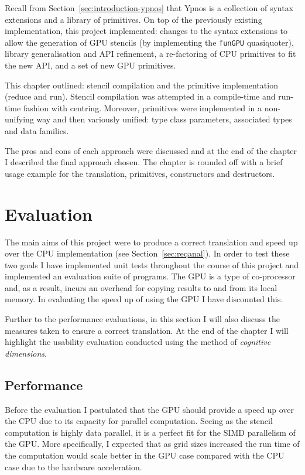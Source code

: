 \documentclass[
    12pt,
    a4paper,
    twoside,
    openright,
    ]{scrbook}
\begin{document}
Recall from Section~\ref{sec:introduction-ypnos} that Ypnos is a collection of
syntax extensions and a library of primitives. On top of the previously existing
implementation, this project implemented: changes to the syntax extensions to
allow the generation of GPU stencils (by implementing the \texttt{funGPU}
quasiquoter), library generalisation and API refinement, a re-factoring of CPU
primitives to fit the new API, and a set of new GPU primitives.

This chapter outlined: stencil compilation and the primitive implementation
(reduce and run). Stencil compilation was attempted in a compile-time and
run-time fashion with centring. Moreover, primitives were implemented in a
non-unifying way and then variously unified: type class parameters, associated
types and data families.

The pros and cons of each approach were discussed and at the end of the chapter
I described the final approach chosen. The chapter is rounded off with a brief
usage example for the translation, primitives, constructors and
destructors.

\chapter{Evaluation}
\label{chap:evaluation}

The main aims of this project were to produce a correct translation and speed up
over the CPU implementation (see Section~\ref{sec:reqanal}). In order to test
these two goals I have implemented unit tests throughout the course of this
project and implemented an evaluation suite of programs. The GPU is a type of
co-processor and, as a result, incurs an overhead for copying results to and
from its local memory. In evaluating the speed up of using the GPU I have
discounted this.

Further to the performance evaluations, in this section I will also discuss the
measures taken to ensure a correct translation. At the end of the chapter I will
highlight the usability evaluation conducted using the method of \emph{cognitive
  dimensions}.

\section{Performance}

Before the evaluation I postulated that the GPU should provide a speed up over
the CPU due to its capacity for parallel computation. Seeing as the stencil
computation is highly data parallel, it is a perfect fit for the SIMD
parallelism of the GPU. More specifically, I expected that as grid sizes
increased the run time of the computation would scale better in the GPU case
compared with the CPU case due to the hardware acceleration.
\end{document}

